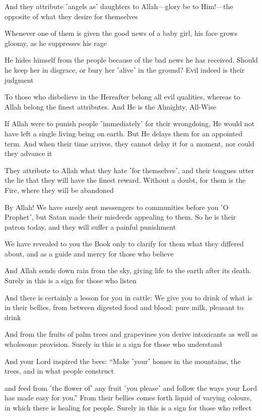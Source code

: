 And they attribute ˹angels as˺ daughters to Allah—glory be to Him!—the opposite of what they desire for themselves

Whenever one of them is given the good news of a baby girl, his face grows gloomy, as he suppresses his rage

He hides himself from the people because of the bad news he has received. Should he keep her in disgrace, or bury her ˹alive˺ in the ground? Evil indeed is their judgment

To those who disbelieve in the Hereafter belong all evil qualities, whereas to Allah belong the finest attributes. And He is the Almighty, All-Wise

If Allah were to punish people ˹immediately˺ for their wrongdoing, He would not have left a single living being on earth. But He delays them for an appointed term. And when their time arrives, they cannot delay it for a moment, nor could they advance it

They attribute to Allah what they hate ˹for themselves˺, and their tongues utter the lie that they will have the finest reward. Without a doubt, for them is the Fire, where they will be abandoned

By Allah! We have surely sent messengers to communities before you ˹O Prophet˺, but Satan made their misdeeds appealing to them. So he is their patron today, and they will suffer a painful punishment

We have revealed to you the Book only to clarify for them what they differed about, and as a guide and mercy for those who believe

And Allah sends down rain from the sky, giving life to the earth after its death. Surely in this is a sign for those who listen

And there is certainly a lesson for you in cattle: We give you to drink of what is in their bellies, from between digested food and blood: pure milk, pleasant to drink

And from the fruits of palm trees and grapevines you derive intoxicants as well as wholesome provision. Surely in this is a sign for those who understand

And your Lord inspired the bees: “Make ˹your˺ homes in the mountains, the trees, and in what people construct

and feed from ˹the flower of˺ any fruit ˹you please˺ and follow the ways your Lord has made easy for you.” From their bellies comes forth liquid of varying colours, in which there is healing for people. Surely in this is a sign for those who reflect

